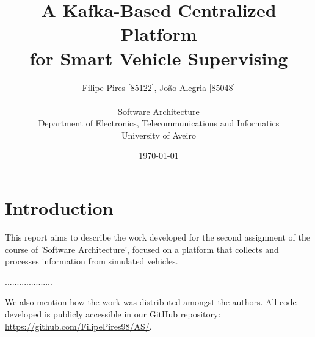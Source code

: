 \documentclass[12pt]{article}
\title{A Kafka-Based Centralized Platform\\for Smart Vehicle Supervising}
\author
{Filipe Pires [85122], João Alegria [85048]\\
\\
Software Architecture\\
\normalsize{Department of Electronics, Telecommunications and Informatics}\\
\normalsize{University of Aveiro}\\
}
\date{\today{}}
\begin{document}
 

\baselineskip18pt

\maketitle 

\section*{Introduction} %

This report aims to describe the work developed for the second assignment of the course of 'Software Architecture', focused on a platform that collects and 
processes information from simulated vehicles.

....................

We also mention how the work was distributed amongst the authors.
All code developed is publicly accessible in our GitHub repository:
\url{https://github.com/FilipePires98/AS/}.
\newpage


\end{document}
